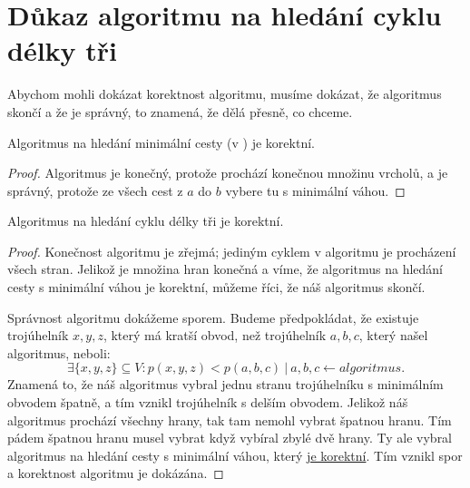 \section{Důkaz algoritmu na hledání cyklu délky tři}
\label{dukaz_algoritmu}

Abychom mohli dokázat korektnost algoritmu, musíme dokázat, že algoritmus skončí a že je správný, to znamená, že dělá přesně, co chceme.

\begin{tvrzeni}
    \label{tvrzeni:adaptace}
    Algoritmus na hledání minimální cesty (v ) je korektní.
\end{tvrzeni}
\begin{proof}
    \label{dukaz:adaptace}
    Algoritmus je konečný, protože prochází konečnou množinu vrcholů, a je správ\-ný, protože ze všech cest z $a$ do $b$ vybere tu s minimální váhou. 
\end{proof}
\begin{tvrzeni}
    \label{tvrzeni:algoritmus}
    Algoritmus na hledání cyklu délky tři je korektní.
\end{tvrzeni}
\begin{proof}
    \label{dukaz:algoritmus}
Konečnost algoritmu je zřejmá; jediným cyklem v algoritmu je procházení všech stran. Jelikož je množina hran konečná a víme, že algoritmus na hledání cesty s minimální váhou je korektní, můžeme říci, že náš algoritmus skončí.

Správnost algoritmu dokážeme sporem. Budeme předpokládat, že existuje trojúhelník $x, y, z$, který má kratší obvod, než trojúhelník $a, b, c$, který našel algoritmus, neboli:
\begin{equation*}
    \exists \{x, y, z\}\subseteq V: p(x, y, z) < p(a, b, c)~|~a, b, c \leftarrow algoritmus.
\end{equation*}
Znamená to, že náš algoritmus vybral jednu stranu trojúhelníku s minimálním obvodem špatně, a tím vznikl trojúhelník s delším obvodem. Jelikož náš algoritmus prochází všechny hrany, tak tam nemohl vybrat špatnou hranu. Tím pádem špatnou hranu musel vybrat když vybíral zbylé dvě hrany. Ty ale vybral algoritmus na hledání cesty s minimální váhou, který \hyperref[dukaz:adaptace]{je korektní}. Tím vznikl spor a korektnost algoritmu je dokázána. 
\end{proof}